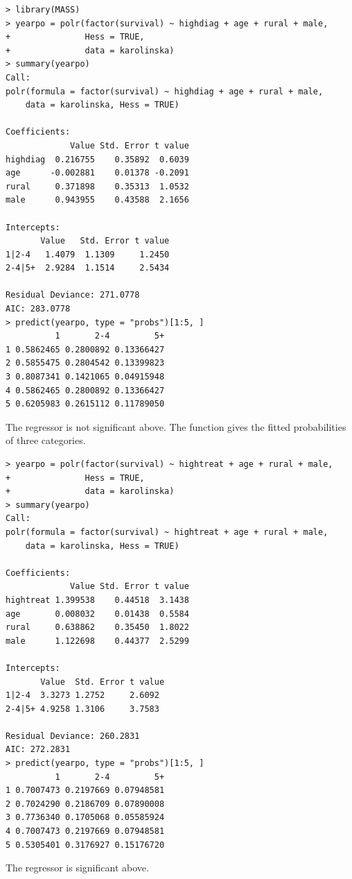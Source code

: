 \begin{lstlisting}
> library(MASS)
> yearpo = polr(factor(survival) ~ highdiag + age + rural + male, 
+               Hess = TRUE, 
+               data = karolinska)
> summary(yearpo)
Call:
polr(formula = factor(survival) ~ highdiag + age + rural + male, 
    data = karolinska, Hess = TRUE)

Coefficients:
             Value Std. Error t value
highdiag  0.216755    0.35892  0.6039
age      -0.002881    0.01378 -0.2091
rural     0.371898    0.35313  1.0532
male      0.943955    0.43588  2.1656

Intercepts:
       Value   Std. Error t value
1|2-4   1.4079  1.1309     1.2450
2-4|5+  2.9284  1.1514     2.5434

Residual Deviance: 271.0778 
AIC: 283.0778 
> predict(yearpo, type = "probs")[1:5, ]
          1       2-4         5+
1 0.5862465 0.2800892 0.13366427
2 0.5855475 0.2804542 0.13399823
3 0.8087341 0.1421065 0.04915948
4 0.5862465 0.2800892 0.13366427
5 0.6205983 0.2615112 0.11789050
\end{lstlisting}

The regressor  is not significant above. The  function gives the fitted probabilities of three categories. 


\begin{lstlisting}
> yearpo = polr(factor(survival) ~ hightreat + age + rural + male, 
+               Hess = TRUE, 
+               data = karolinska)
> summary(yearpo)
Call:
polr(formula = factor(survival) ~ hightreat + age + rural + male, 
    data = karolinska, Hess = TRUE)

Coefficients:
             Value Std. Error t value
hightreat 1.399538    0.44518  3.1438
age       0.008032    0.01438  0.5584
rural     0.638862    0.35450  1.8022
male      1.122698    0.44377  2.5299

Intercepts:
       Value  Std. Error t value
1|2-4  3.3273 1.2752     2.6092 
2-4|5+ 4.9258 1.3106     3.7583 

Residual Deviance: 260.2831 
AIC: 272.2831 
> predict(yearpo, type = "probs")[1:5, ]
          1       2-4         5+
1 0.7007473 0.2197669 0.07948581
2 0.7024290 0.2186709 0.07890008
3 0.7736340 0.1705068 0.05585924
4 0.7007473 0.2197669 0.07948581
5 0.5305401 0.3176927 0.15176720
\end{lstlisting}

The regressor  is significant above. 



